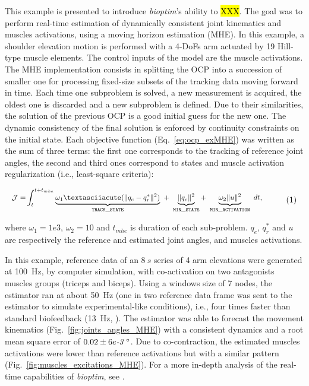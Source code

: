 This example is presented to introduce \textit{bioptim}'s ability to \hl{XXX}.
The goal was to perform real-time estimation of dynamically consistent joint kinematics and muscles activations, using a moving horizon estimation (MHE). 
In this example, a shoulder elevation motion is performed with a 4-DoFs arm actuated by 19 Hill-type muscle elements.
The control inputs of the model are the muscle activations.
The MHE implementation consists in splitting the OCP into a succession of smaller one for processing fixed-size subsets of the tracking data moving forward in time. 
Each time one subproblem is solved, a new measurement is acquired, the oldest one is discarded and a new subproblem is defined. 
Due to their similarities, the solution of the previous OCP is a good initial guess for the new one. 
The dynamic consistency of the final solution is enforced by continuity constraints on the initial state. 
Each objective function (Eq.~\ref{eq:ocp_exMHE}) was written as the sum of three terms: the first one corresponds to the tracking of reference joint angles, the second and third ones correspond to states and muscle activation regularization (i.e., least-square criteria): 

\[ 
\resizebox{0.9\columnwidth}{!}{$ 
\begin{aligned}
\mathcal{J} = &\int_t^{t+t_{mhe}}\underbrace{\omega_1´(\|q_{e} - q^*_{r}\|^{2})}_{\mathtt{TRACK\_STATE}}~ 
+ ~ \underbrace{\|q_{e}\|^2}_{\mathtt{MIN\_STATE}}
+ ~ \underbrace{\omega_2 \|u\|^2}_{\mathtt{MIN\_ACTIVATION}}~dt, 
\end{aligned}  
$}  
\addtag  
\label{eq:ocp_exMHE}  
\]  

\noindent where $\omega_1 =1e3$, $\omega_2 = 10$ and $t_{mhe}$ is duration of each sub-problem. $q_{e}$, $q^*_{r}$  and $u$ are respectively the reference and estimated joint angles, and muscles activations. 

In this example, reference data of an $8~s$ series of 4 arm elevations were generated at 100~Hz, by computer simulation, with co-activation on two antagonists muscles groups (triceps and biceps).
Using a windows size of 7 nodes, the estimator ran at about 50~Hz (one in two reference data frame was sent to the estimator to simulate experimental-like conditions), i.e., four times faster than standard biofeedback (13~Hz, \cite{kannape2013biofeedback}).
The estimator was able to forecast the movement kinematics (Fig.~\ref{fig:joints_angles_MHE}) with a consistent dynamics and a root mean square error of $0.02\pm6e\emph{-3}\text{~}^{\circ}$.
Due to co-contraction, the estimated muscles activations were lower than reference activations but with a similar pattern (Fig.~\ref{fig:muscles_excitations_MHE}).  
For a more in-depth analysis of the real-time capabilities of \textit{bioptim}, see \cite{bailly2020real}.
 

